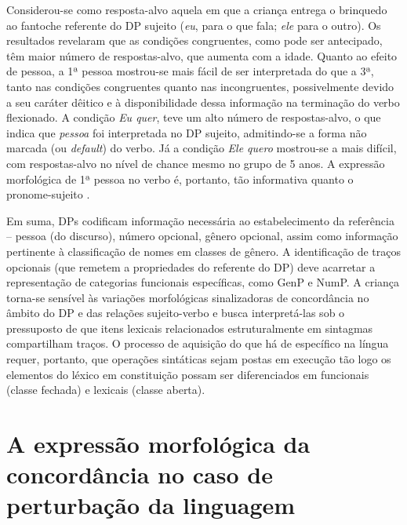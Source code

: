 \documentclass[output=paper]{LSP/langsci}
\begin{document}
Considerou-se como resposta-alvo aquela em que a criança entrega o brinquedo ao fantoche referente do DP sujeito (\textit{eu}, para o que fala; \textit{ele} para o outro). Os resultados revelaram que as condições congruentes, como pode ser antecipado, têm maior número de respostas-alvo, que aumenta com a idade. Quanto ao efeito de pessoa, a 1ª pessoa mostrou-se mais fácil de ser interpretada do que a 3ª, tanto nas condições congruentes quanto nas incongruentes, possivelmente devido a seu caráter dêitico e à disponibilidade dessa informação na terminação do verbo flexionado. A condição \textit{Eu quer}, teve um alto número de respostas-alvo, o que indica que \textit{pessoa} foi interpretada no DP sujeito, admitindo-se a forma não marcada (ou \textit{default}) do verbo. Já a condição \textit{Ele quero} mostrou-se a mais difícil, com respostas-alvo no nível de chance mesmo no grupo de 5 anos. A expressão morfológica de 1ª pessoa no verbo é, portanto, tão informativa quanto o pronome-sujeito \citep{martins2007,correamartins2008}. 

Em suma, DPs codificam informação necessária ao estabelecimento da referência – pessoa (do discurso), número opcional, gênero opcional, assim como informação pertinente à classificação de nomes em classes de gênero. A identificação de traços opcionais (que remetem a propriedades do referente do DP) deve acarretar a representação de categorias funcionais específicas, como GenP e NumP. A criança torna-se sensível às variações morfológicas sinalizadoras de concordância no âmbito do DP e das relações sujeito-verbo e busca interpretá-las sob o pressuposto de que itens lexicais relacionados estruturalmente em sintagmas compartilham traços. O processo de aquisição do que há de específico na língua requer, portanto, que operações sintáticas sejam postas em execução tão logo os elementos do léxico em constituição possam ser diferenciados em funcionais (classe fechada) e lexicais (classe aberta).

\section{A expressão morfológica da concordância no caso de perturbação da linguagem}
\label{sec:correanp_expressao}
\end{document}
